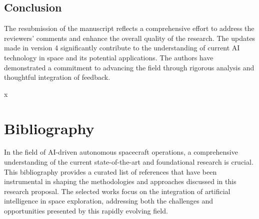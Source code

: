 \documentclass[a4paper,12pt]{article}
\begin{document}
\subsection{Conclusion}

The resubmission of the manuscript reflects a comprehensive effort to address the reviewers' comments and enhance the overall quality of the research. The updates made in version 4 significantly contribute to the understanding of current AI technology in space and its potential applications. The authors have demonstrated a commitment to advancing the field through rigorous analysis and thoughtful integration of feedback.



x
\section{Bibliography}

In the field of AI-driven autonomous spacecraft operations, a comprehensive understanding of the current state-of-the-art and foundational research is crucial. This bibliography provides a curated list of references that have been instrumental in shaping the methodologies and approaches discussed in this research proposal. The selected works focus on the integration of artificial intelligence in space exploration, addressing both the challenges and opportunities presented by this rapidly evolving field.
\end{document}
